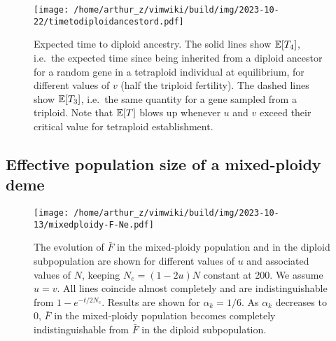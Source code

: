 \documentclass[11pt,a4paper]{article}
\begin{document}
\begin{figure}
\centering
\texttt{[image: /home/arthur\_z/vimwiki/build/img/2023-10-22/timetodiploidancestord.pdf]}
\caption{Expected time to diploid ancestry. The solid lines show
\(\mathbb{E}[T_4]\), i.e.~the expected time since being inherited from a
diploid ancestor for a random gene in a tetraploid individual at
equilibrium, for different values of \(v\) (half the triploid
fertility). The dashed lines show \(\mathbb{E}[T_3]\), i.e.~the same quantity
for a gene sampled from a triploid. Note that \(\mathbb{E}[T]\) blows up
whenever \(u\) and \(v\) exceed their critical value for tetraploid
establishment. \label{fig:ttdip}}
\end{figure}

\subsection{Effective population size of a mixed-ploidy deme \label{sec:effsize}}

\begin{figure}
\centering
\texttt{[image: /home/arthur\_z/vimwiki/build/img/2023-10-13/mixedploidy-F-Ne.pdf]}
\caption{The evolution of \(\bar{F}\) in the mixed-ploidy population and
in the diploid subpopulation are shown for different values of \(u\) and
associated values of \(N\), keeping \(N_e = (1-2u)N\) constant at 200.
We assume \(u=v\). All lines coincide almost completely and are
indistinguishable from \(1-e^{-t/2N_e}\). Results are shown for
\(\alpha_k=1/6\). As \(\alpha_k\) decreases to 0, \(\bar{F}\) in the
mixed-ploidy population becomes completely indistinguishable from
\(\bar{F}\) in the diploid subpopulation.}\label{fig:fNe}
\end{figure}
\end{document}
